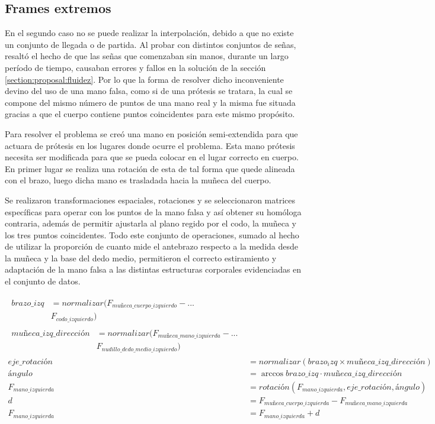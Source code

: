 \subsection{Frames extremos}
En el segundo caso no se puede realizar la interpolación, debido a que no existe un conjunto de llegada o de partida. Al probar con distintos conjuntos de señas, resaltó el hecho de que las señas que comenzaban sin manos, durante un largo período de tiempo, causaban errores y fallos en la solución de la sección \ref{section:proposal:fluidez}.  Por lo que la forma de resolver dicho inconveniente devino del uso de una mano falsa, como si de una prótesis se tratara, la cual se compone del mismo número de puntos de una mano real y la misma fue situada gracias a que el cuerpo contiene puntos coincidentes para este mismo propósito.

Para resolver el problema se creó una mano en posición semi-extendida para que actuara de prótesis en los lugares 
donde ocurre el problema. Esta mano prótesis necesita ser modificada para que se pueda colocar en el lugar correcto 
en cuerpo. En primer lugar se realiza una rotación de esta de tal forma que quede alineada con el brazo, luego dicha 
mano es trasladada hacia la muñeca del cuerpo.

Se realizaron transformaciones espaciales, rotaciones y se seleccionaron matrices específicas para operar con los puntos de la mano falsa y así obtener su homóloga contraria, además de permitir ajustarla al plano regido por el codo, la muñeca y los tres puntos coincidentes. Todo este conjunto de operaciones, sumado al hecho de utilizar la proporción de cuanto mide el antebrazo respecto a la medida desde la muñeca y la base del dedo medio, permitieron el correcto estiramiento y adaptación de la mano falsa a las distintas estructuras corporales evidenciadas en el conjunto de datos.

\begin{align}
\begin{split}
brazo\_izq &= normalizar(F_{muñeca\_cuerpo\_izquierdo} - ... \\
& F_{codo\_izquierdo})
\end{split}\\
\begin{split}
muñeca\_izq\_dirección &= normalizar(F_{muñeca\_mano\_izquierda} - ... \\
& F_{nudillo\_dedo\_medio\_izquierdo})
\end{split}\\
eje\_rotación &= normalizar(brazo_izq \times muñeca\_izq\_dirección) \\
ángulo &= \arccos brazo\_izq \cdot muñeca\_izq\_dirección \\
F_{mano\_izquierda} &= rotación(F_{mano\_izquierda}, eje\_rotación, ángulo) \\
d &= F_{muñeca\_cuerpo\_izquierda} - F_{muñeca\_mano\_izquierda} \\
F_{mano\_izquierda} &= F_{mano\_izquierda} + d
\end{align}


